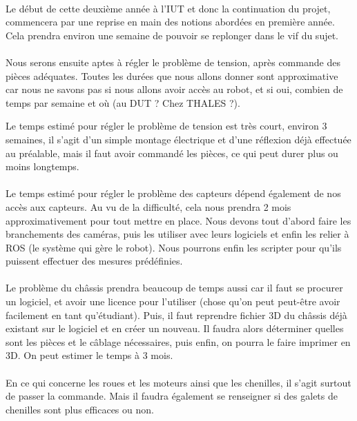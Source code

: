 \documentclass{PackagerQualityN}
\begin{document}
\paragraph{}
Le début de cette deuxième année à l'IUT et donc la continuation du projet, commencera par une reprise en main des notions abordées en première année. Cela prendra environ une semaine de pouvoir se replonger dans le vif du sujet.
\paragraph{}
Nous serons ensuite aptes à régler le problème de tension, après commande des pièces adéquates.
Toutes les durées que nous allons donner sont approximative car nous ne savons pas si nous allons avoir accès au robot, et si oui, combien de temps par semaine et où (au DUT ? Chez THALES ?).

Le temps estimé pour régler le problème de tension est très court, environ 3 semaines, il s'agit d'un simple montage électrique et d'une réflexion déjà effectuée au préalable, mais il faut avoir commandé les pièces, ce qui peut durer plus ou moins longtemps.
\paragraph{}
Le temps estimé pour régler le problème des capteurs dépend également de nos accès aux capteurs. Au vu de la difficulté, cela nous prendra 2 mois approximativement pour tout mettre en place. Nous devons tout d'abord faire les branchements des caméras, puis les utiliser avec leurs logiciels et enfin les relier à ROS (le système qui gère le robot).
Nous pourrons enfin les scripter pour qu'ils puissent effectuer des mesures prédéfinies.
\paragraph{}
Le problème du châssis prendra beaucoup de temps aussi car il faut se procurer un logiciel, et avoir une licence pour l'utiliser (chose qu'on peut peut-être avoir facilement en tant qu'étudiant). Puis, il faut reprendre fichier 3D du châssis déjà existant sur le logiciel et en créer un nouveau. Il faudra alors déterminer quelles sont les pièces et le câblage nécessaires, puis enfin, on pourra le faire imprimer en 3D. On peut estimer le temps à 3 mois.
\paragraph{}
En ce qui concerne les roues et les moteurs ainsi que les chenilles, il s'agit surtout de passer la commande. Mais il faudra également se renseigner si des galets de chenilles sont plus efficaces ou non.
\end{document}
